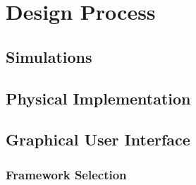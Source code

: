 
\section{Design Process}

\subsection{Simulations}

\subsection{Physical Implementation}



\subsection{Graphical User Interface}
\subsubsection{Framework Selection}

